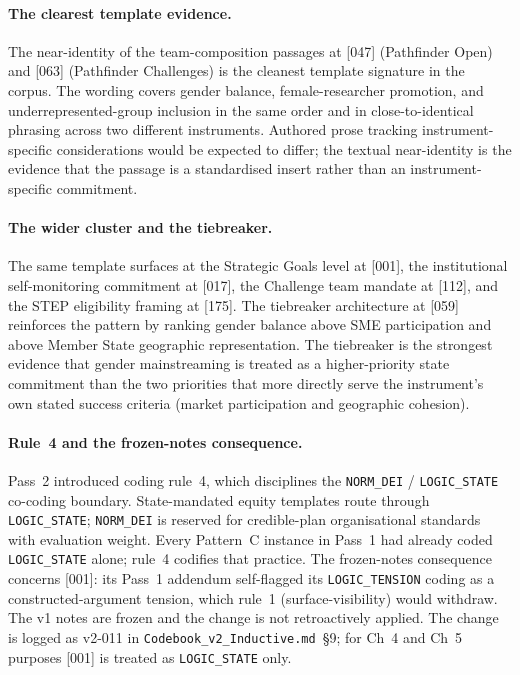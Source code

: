 \paragraph{The clearest template evidence.}
The near-identity of the team-composition passages at [047]
(Pathfinder Open) and [063] (Pathfinder Challenges) is the cleanest
template signature in the corpus. The wording covers gender balance,
female-researcher promotion, and underrepresented-group inclusion in
the same order and in close-to-identical phrasing across two
different instruments. Authored prose tracking instrument-specific
considerations would be expected to differ; the textual near-identity
is the evidence that the passage is a standardised insert rather than
an instrument-specific commitment.

\paragraph{The wider cluster and the tiebreaker.}
The same template surfaces at the Strategic Goals level at [001], the
institutional self-monitoring commitment at [017], the Challenge team
mandate at [112], and the STEP eligibility framing at [175]. The
tiebreaker architecture at [059] reinforces the pattern by ranking
gender balance above SME participation and above Member State
geographic representation. The tiebreaker is the strongest evidence
that gender mainstreaming is treated as a higher-priority state
commitment than the two priorities that more directly serve the
instrument's own stated success criteria (market participation and
geographic cohesion).

\paragraph{Rule~4 and the frozen-notes consequence.}
Pass~2 introduced coding rule~4, which disciplines the
\texttt{NORM\_DEI} / \texttt{LOGIC\_STATE} co-coding boundary.
State-mandated equity templates route through \texttt{LOGIC\_STATE};
\texttt{NORM\_DEI} is reserved for credible-plan organisational
standards with evaluation weight. Every Pattern~C instance in Pass~1
had already coded \texttt{LOGIC\_STATE} alone; rule~4 codifies that
practice. The frozen-notes consequence concerns [001]: its Pass~1
addendum self-flagged its \texttt{LOGIC\_TENSION} coding as a
constructed-argument tension, which rule~1 (surface-visibility) would
withdraw. The v1 notes are frozen and the change is not retroactively
applied. The change is logged as v2-011 in
\texttt{Codebook\_v2\_Inductive.md}~\S9; for Ch~4 and Ch~5 purposes
[001] is treated as \texttt{LOGIC\_STATE} only.

